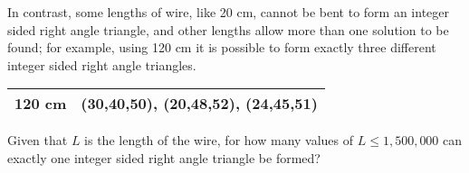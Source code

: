 In contrast, some lengths of wire, like 20 cm, cannot be bent to form an integer sided right angle triangle, and other lengths allow more than one solution to be found; for example, using 120 cm it is possible to form exactly three different integer sided right angle triangles.

\begin{center}
    \begin{tabular}{|l|l|}
        \hline
        \textbf{120 cm} & (30,40,50), (20,48,52), (24,45,51)\\
        \hline
    \end{tabular}
\end{center}


Given that $L$ is the length of the wire, for how many values of $L \leqslant 1,500,000$ can exactly one integer sided right angle triangle be formed?